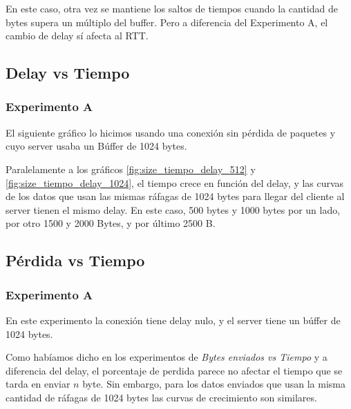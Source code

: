   
  
  En este caso, otra vez se mantiene los saltos de tiempos cuando la cantidad de bytes supera un m\'ultiplo del buffer. Pero a diferencia del Experimento A, el cambio de delay s\'i afecta al RTT. 

\subsection{Delay vs Tiempo}
\subsubsection{Experimento A}

  El siguiente gr\'afico lo hicimos usando una conexi\'on sin p\'erdida de paquetes y cuyo server usaba un B\'uffer de 1024 bytes.


  Paralelamente a los gr\'aficos \ref{fig:size_tiempo_delay_512} y \ref{fig:size_tiempo_delay_1024}, el tiempo crece en funci\'on del delay, y las curvas de los datos que usan las mismas r\'afagas de 1024 bytes para llegar del cliente al server tienen el mismo delay. En este caso, 500 bytes y 1000 bytes por un lado, por otro 1500 y 2000 Bytes, y por \'ultimo 2500 B. 

\subsection{P\'erdida vs Tiempo}
\subsubsection{Experimento A}

  En este experimento la conexi\'on tiene delay nulo, y el server tiene un b\'uffer de 1024 bytes. 
  
  
  Como hab\'iamos dicho en los experimentos de \textit{Bytes enviados vs Tiempo} y a diferencia del delay, el porcentaje de perdida parece no afectar el tiempo que se tarda en enviar $n$ byte. Sin embargo, para los datos enviados que usan la misma cantidad de r\'afagas de 1024 bytes las curvas de crecimiento son similares. 

